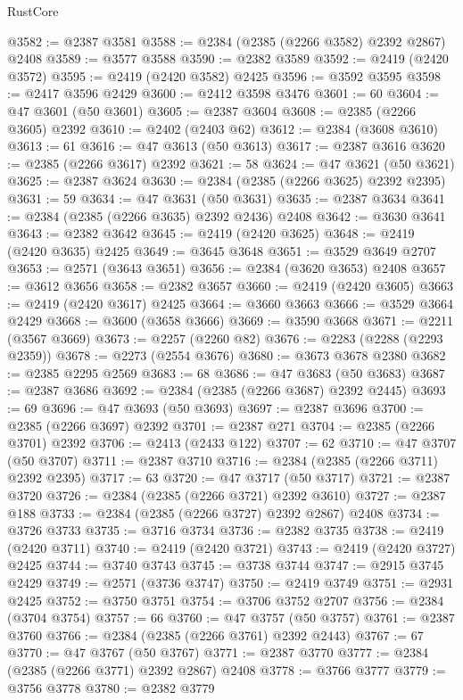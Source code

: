 \begin{lexlean}{RustCore}
\begin{coremodule}
@3582 := @2387 @3581
@3588 := @2384 (@2385 (@2266 @3582) @2392 @2867) @2408
@3589 := @3577 @3588
@3590 := @2382 @3589
@3592 := @2419 (@2420 @3572)
@3595 := @2419 (@2420 @3582) @2425
@3596 := @3592 @3595
@3598 := @2417 @3596 @2429
@3600 := @2412 @3598 @3476
@3601 := 60
@3604 := @47 @3601 (@50 @3601)
@3605 := @2387 @3604
@3608 := @2385 (@2266 @3605) @2392
@3610 := @2402 (@2403 @62)
@3612 := @2384 (@3608 @3610)
@3613 := 61
@3616 := @47 @3613 (@50 @3613)
@3617 := @2387 @3616
@3620 := @2385 (@2266 @3617) @2392
@3621 := 58
@3624 := @47 @3621 (@50 @3621)
@3625 := @2387 @3624
@3630 := @2384 (@2385 (@2266 @3625) @2392 @2395)
@3631 := 59
@3634 := @47 @3631 (@50 @3631)
@3635 := @2387 @3634
@3641 := @2384 (@2385 (@2266 @3635) @2392 @2436) @2408
@3642 := @3630 @3641
@3643 := @2382 @3642
@3645 := @2419 (@2420 @3625)
@3648 := @2419 (@2420 @3635) @2425
@3649 := @3645 @3648
@3651 := @3529 @3649 @2707
@3653 := @2571 (@3643 @3651)
@3656 := @2384 (@3620 @3653) @2408
@3657 := @3612 @3656
@3658 := @2382 @3657
@3660 := @2419 (@2420 @3605)
@3663 := @2419 (@2420 @3617) @2425
@3664 := @3660 @3663
@3666 := @3529 @3664 @2429
@3668 := @3600 (@3658 @3666)
@3669 := @3590 @3668
@3671 := @2211 (@3567 @3669)
@3673 := @2257 (@2260 @82)
@3676 := @2283 (@2288 (@2293 @2359))
@3678 := @2273 (@2554 @3676)
@3680 := @3673 @3678 @2380
@3682 := @2385 @2295 @2569
@3683 := 68
@3686 := @47 @3683 (@50 @3683)
@3687 := @2387 @3686
@3692 := @2384 (@2385 (@2266 @3687) @2392 @2445)
@3693 := 69
@3696 := @47 @3693 (@50 @3693)
@3697 := @2387 @3696
@3700 := @2385 (@2266 @3697) @2392
@3701 := @2387 @271
@3704 := @2385 (@2266 @3701) @2392
@3706 := @2413 (@2433 @122)
@3707 := 62
@3710 := @47 @3707 (@50 @3707)
@3711 := @2387 @3710
@3716 := @2384 (@2385 (@2266 @3711) @2392 @2395)
@3717 := 63
@3720 := @47 @3717 (@50 @3717)
@3721 := @2387 @3720
@3726 := @2384 (@2385 (@2266 @3721) @2392 @3610)
@3727 := @2387 @188
@3733 := @2384 (@2385 (@2266 @3727) @2392 @2867) @2408
@3734 := @3726 @3733
@3735 := @3716 @3734
@3736 := @2382 @3735
@3738 := @2419 (@2420 @3711)
@3740 := @2419 (@2420 @3721)
@3743 := @2419 (@2420 @3727) @2425
@3744 := @3740 @3743
@3745 := @3738 @3744
@3747 := @2915 @3745 @2429
@3749 := @2571 (@3736 @3747)
@3750 := @2419 @3749
@3751 := @2931 @2425
@3752 := @3750 @3751
@3754 := @3706 @3752 @2707
@3756 := @2384 (@3704 @3754)
@3757 := 66
@3760 := @47 @3757 (@50 @3757)
@3761 := @2387 @3760
@3766 := @2384 (@2385 (@2266 @3761) @2392 @2443)
@3767 := 67
@3770 := @47 @3767 (@50 @3767)
@3771 := @2387 @3770
@3777 := @2384 (@2385 (@2266 @3771) @2392 @2867) @2408
@3778 := @3766 @3777
@3779 := @3756 @3778
@3780 := @2382 @3779

\end{coremodule}
\end{lexlean}
